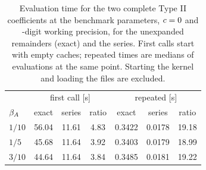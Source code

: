 \begin{table}[t]
\centering


\footnotesize
\setlength{\tabcolsep}{2.6pt}
\begin{tabular}{lcccccc}
\toprule
& \multicolumn{3}{c}{first call [s]} & \multicolumn{3}{c}{repeated [s]} \\
$\beta_A$ & exact & series & ratio & exact & series & ratio \\
\midrule
$1/10$ & 56.04 & 11.61 & 4.83 & 0.3422 & 0.0178 & 19.18 \\
$1/5$ & 45.68 & 11.64 & 3.92 & 0.3403 & 0.0179 & 18.99 \\
$3/10$ & 44.64 & 11.64 & 3.84 & 0.3485 & 0.0181 & 19.22 \\
\bottomrule
\end{tabular}
\caption{Evaluation time for the two complete Type II coefficients at the benchmark parameters, $c=0$ and \TimingPrecision-digit working precision, for the unexpanded remainders (exact) and the series. First calls start with empty caches; repeated times are medians of \TimingRepeats{} evaluations at the same point. Starting the kernel and loading the files are excluded.}
\label{tab:timing}
\end{table}
